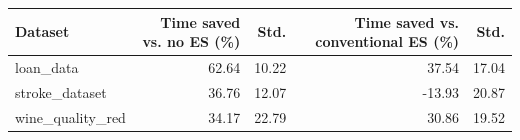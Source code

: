 \begin{tabular}{lrrrr}
\toprule
Dataset & Time saved vs. no ES (\%) & Std. & Time saved vs. conventional ES (\%) & Std. \\
\midrule
loan_data & 62.64 & 10.22 & 37.54 & 17.04 \\
stroke_dataset & 36.76 & 12.07 & -13.93 & 20.87 \\
wine_quality_red & 34.17 & 22.79 & 30.86 & 19.52 \\
\bottomrule
\end{tabular}
